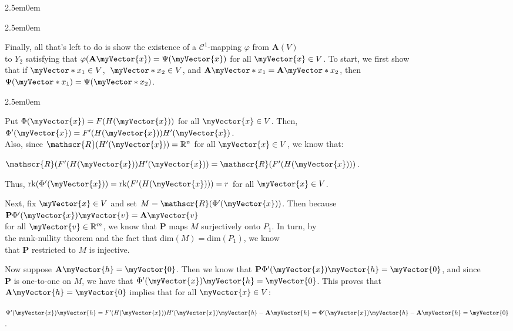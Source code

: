\documentclass{book}
\newcommand{\hFour}{%
   \color{Cerulean}
   \fontsize{12}{14}\selectfont%
}
\newenvironment{myIndent}{%
   \begin{adjustwidth}{2.5em}{0em}%
}{%
   \end{adjustwidth}%
}
\newcommand{\myDim}[1]{\mathrm{dim}(#1)}
\newcommand{\rank}[1]{\mathrm{rk}(#1)}
\newcommand{\rangeSp}[1]{\mathscr{R}(#1)}
\newcommand{\retTwo}{\hfill\bigbreak}
\newcommand{\mVec}[1]{\myVector{#1}}
\newcommand{\mVecAst}[1]{\myVector*{#1}}
\newcommand{\mMat}[1]{\mathbf{#1}}
\begin{document}
{\begin{myIndent}
{\begin{myIndent}
      Finally, all that's left to do is show the existence of a $\mathscr{C}^1$-mapping $\varphi$ from $\mMat{A}(V)$\\ to $Y_2$ satisfying that $\varphi(\mMat{A}\mVec{x}) = \Psi(\mVec{x})$ for all $\mVec{x} \in V$. To start, we first show\\ that if $\mVecAst{x}_1 \in V$, $\hspace{0.3em}\mVecAst{x}_2 \in V$, and $\mMat{A}\mVecAst{x}_1 = \mMat{A}\mVecAst{x}_2$, then $\Psi(\mVecAst{x}_1) = \Psi(\mVecAst{x}_2)$.
      {\begin{myIndent}\hFour
         Put $\Phi(\mVec{x}) = F(H(\mVec{x}))$ for all $\mVec{x} \in V$. Then, $\Phi^\prime(\mVec{x}) = F^\prime(H(\mVec{x}))H^\prime(\mVec{x})$.\\ Also, since $\rangeSp{H^\prime(\mVec{x})} = \mathbb{R}^n$ for all $\mVec{x} \in V$, we know that: 
         
         {\centering$\rangeSp{F^\prime(H(\mVec{x}))H^\prime(\mVec{x})} = \rangeSp{F^\prime(H(\mVec{x}))}$.\retTwo\par}
         
         Thus, $\rank{\Phi^\prime(\mVec{x})} = \rank{F^\prime(H(\mVec{x}))} = r$  for all $\mVec{x} \in V$.

         \newpage

         Next, fix $\mVec{x} \in V$ and set $M = \rangeSp{\Phi^\prime(\mVec{x})}$. Then because $\mMat{P}\Phi^\prime(\mVec{x})\mVec{v} = \mMat{A}\mVec{v}$\\ for all $\mVec{v} \in \mathbb{R}^m$, we know that $\mMat{P}$ maps $M$ surjectively onto $P_1$. In turn, by\\ the rank-nullity theorem and the fact that $\myDim{M} = \myDim{P_1}$, we know\\ that $\mMat{P}$ restricted to $M$ is injective.\retTwo

         Now suppose $\mMat{A}\mVec{h} = \mVec{0}$. Then we know that $\mMat{P}\Phi^\prime(\mVec{x})\mVec{h} = \mVec{0}$, and since\\ [-2pt]  $\mMat{P}$ is one-to-one on $M$, we have that $\Phi^\prime(\mVec{x})\mVec{h} = \mVec{0}$. This proves that\\ [-2pt]  $\mMat{A}\mVec{h} = \mVec{0}$ implies that for all $\mVec{x} \in V$:
         
         {\centering $\Psi^\prime(\mVec{x})\mVec{h} = F^\prime(H(\mVec{x}))H^\prime(\mVec{x})\mVec{h} - \mMat{A}\mVec{h} = \Phi^\prime(\mVec{x})\mVec{h} - \mMat{A}\mVec{h} = \mVec{0}$. \retTwo\par}


\end{myIndent}}
\end{myIndent}}
\end{myIndent}}
\end{document}
